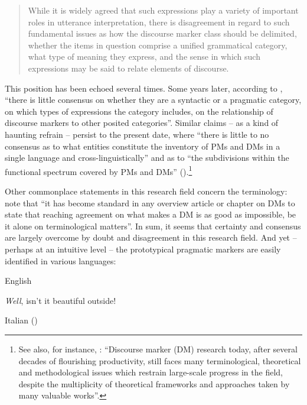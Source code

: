 \begin{quote}
While it is widely agreed that such expressions play a variety of important roles in utterance interpretation, there is disagreement in regard to such fundamental issues as how the discourse marker class should be delimited, whether the items in question comprise a unified grammatical category, what type of meaning they express, and the sense in which such expressions may be said to relate elements of discourse. \citep[227]{Schourup1999}
\end{quote}

This position has been echoed several times. Some years later, according to \citet[419--420]{Lewis2011}, “there is little consensus on whether they are a syntactic or a pragmatic category, on which types of expressions the category includes, on the relationship of discourse markers to other posited categories”. Similar claims – as a kind of haunting refrain – persist to the present date, where “there is little to no consensus as to what entities constitute the inventory of PMs and DMs in a single language and cross-linguistically” and as to “the subdivisions within the functional spectrum covered by PMs and DMs” (\citealt[4]{FedrianiSansò2017}).\footnote{See also, for instance, \citet[99]{Crible2017}: “Discourse marker (DM) research today, after several decades of flourishing productivity, still faces many terminological, theoretical and methodological issues which restrain large-scale progress in the field, despite the multiplicity of theoretical frameworks and approaches taken by many valuable works”.}

Other commonplace statements in this research field concern the terminology: \citet[5]{DegandEtAl2013} note that “it has become standard in any overview article or chapter on DMs to state that reaching agreement on what makes a DM is as good as impossible, be it alone on terminological matters”. In sum, it seems that certainty and consensus are largely overcome by doubt and disagreement in this research field. And yet – perhaps at an intuitive level – the prototypical pragmatic markers are easily identified in various languages:

\ea%
    \label{ex:key:1}

          English \citep[1027]{Schourup2001}

\textit{Well}, isn’t it beautiful outside!
    \z  

\ea%
    \label{ex:key:2} 

          Italian (\citealt[455]{Bazzanella2006})

